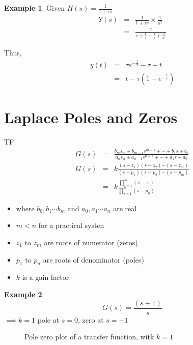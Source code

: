 \documentclass[11pt]{article} %
\theoremstyle{definition}
\newtheorem{example}{Example}[subsection]
\begin{document}
\begin{example}

Given $H(s) = \frac{1}{1+\tau s}$
\begin{eqnarray}
Y(s) &=& \frac{1}{1+\tau s} \times \frac{1}{s^2}  \nonumber  \\
&=& \frac{\tau}{s+\frac{1}{\tau} - \frac{\tau}{s} + \frac{1}{s^2}}
\end{eqnarray}

Thus,
\begin{eqnarray}
y(t) &=& \tau e^{-\frac{t}{\tau}} - \tau + t \nonumber \\
&=& t-\tau\left(1-e^{-\frac{t}{\tau}}\right)
\end{eqnarray}
\end{example}
\section{Laplace Poles and Zeros}
TF
\begin{eqnarray}
G(s) &=& \frac{b_ms_m + b_{m-1}s^{m-1}+\cdots + b_1s+b_0}{a_ns_n + a_{n-1}s^{n-1}+\cdots + a_1s+a_0} \nonumber \\
G(s) &=& k \frac{(s-z_1)(s-z_2)\cdots(s-z_m)}{(s-p_1)(s-p_2)\cdots(s-p_m)} \nonumber \\
&=& k\frac{\prod\limits_{i=1}^m(s-z_i)}{\prod\limits_{i=1}^n(s-p_n)}
\end{eqnarray}

\begin{itemize}
\item where $b_0, b_1 \cdots b_m$ and $a_0, a_1 \cdots a_n$ are real
\item $m<n$ for a practical systen
\item $z_1$ to $z_m$ are roots of numerator (zeros)
\item $p_1$ to $p_n$ are roots of denominator (poles)
\item $k$ is a gain factor
\end{itemize}

\begin{example}
\begin{equation}
G(s) = \frac{(s+1)}{s}
\end{equation}
$\implies k = 1$ pole at $s=0$, zero at $s=-1$
\end{example}
\begin{figure}[h]
	\centering
	\caption{Pole zero plot of a transfer function, witk $k=1$}
\end{figure}
\end{document}
